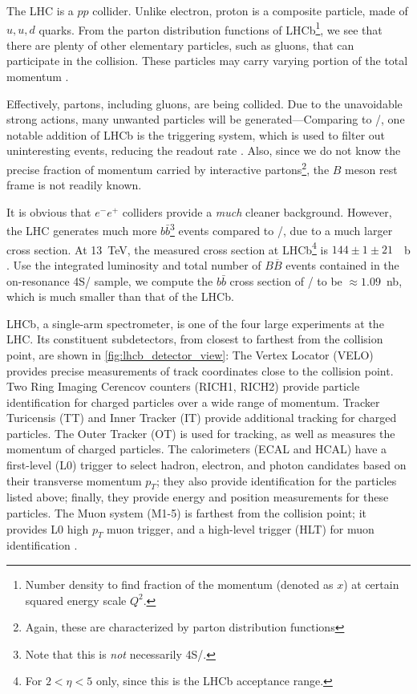 The LHC is a $pp$ collider.
Unlike electron, proton is a composite particle, made of $u, u, d$ quarks.
From the parton distribution functions of LHCb\footnote{
    Number density to find fraction of the momentum (denoted as $x$) at certain
    squared energy scale $Q^2$.
}, we see that there are plenty of other elementary particles, such as gluons,
that can participate in the collision.
These particles may carry varying portion of the total
momentum \cite{Ball:2014uwa}.

Effectively, partons, including gluons, are being collided.
Due to the unavoidable strong actions, many unwanted particles will be
generated---Comparing to \BaBar/, one notable addition of LHCb is the triggering
system, which is used to filter out uninteresting events, reducing the readout
rate \cite{LHCb:2008}.
Also, since we do not know the precise fraction of momentum carried by
interactive partons\footnote{
Again, these are characterized by parton distribution functions}, the $B$ meson
rest frame is not readily known.

It is obvious that $e^- e^+$ colliders provide a \emph{much} cleaner background.
However, the LHC generates much more $b\bar{b}$\footnote{
    Note that this is \emph{not} necessarily \Y4S/.
} events compared to \BaBar/, due to a much larger cross section.
At \SI{13}{TeV}, the measured cross section at LHCb\footnote{
    For $2 < \eta < 5$ only, since this is the LHCb acceptance range.
} is $144 \pm 1 \pm 21$~\si{\mu b} \cite{Aaij:2016avz}.
Use the integrated luminosity and total number of $B\overline{B}$ events
contained in the on-resonance \Y4S/ sample, we compute the $b\bar{b}$ cross
section of \BaBar/ to be $\approx 1.09$~\si{nb}, which is much smaller than that
of the LHCb.

LHCb, a single-arm spectrometer, is one of the four large experiments at the
LHC.
Its constituent subdetectors, from closest to farthest from the collision point,
are shown in \autoref{fig:lhcb_detector_view}:
The Vertex Locator (VELO) provides precise measurements of track coordinates
close to the collision point.
Two Ring Imaging Cerencov counters (RICH1, RICH2) provide particle
identification for charged particles over a wide range of momentum.
Tracker Turicensis (TT) and Inner Tracker (IT) provide additional tracking for
charged particles.
The Outer Tracker (OT) is used for tracking, as well as measures the momentum
of charged particles.
The calorimeters (ECAL and HCAL) have a first-level (L0) trigger to select
hadron, electron, and photon candidates based on their transverse momentum
$p_T$;
they also provide identification for the particles listed above;
finally, they provide energy and position measurements for these particles.
The Muon system (M1-5) is farthest from the collision point;
it provides L0 high $p_T$ muon trigger, and a high-level trigger (HLT) for muon
identification \cite{LHCb:2008}.

